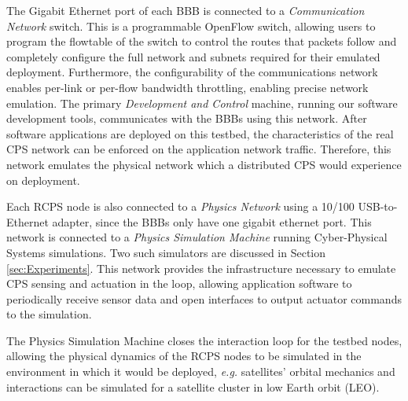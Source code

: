 The Gigabit Ethernet port of each BBB is connected to a \emph{Communication Network} switch. This is a programmable OpenFlow \cite{openflow} switch, allowing users to program the flowtable of the switch to control the routes that packets follow and completely configure the full network and subnets required for their emulated deployment.  Furthermore, the configurability of the communications network enables per-link or per-flow bandwidth throttling, enabling precise network emulation.  The primary \emph{Development and Control} machine, running our software development tools, communicates with the BBBs using this network. After software applications are deployed on this testbed, the characteristics of the real CPS network can be enforced on the application network traffic. Therefore, this network emulates the physical network which a distributed CPS would experience on deployment.

Each RCPS node is also connected to a \emph{Physics Network} using a 10/100 USB-to-Ethernet adapter, since the BBBs only have one gigabit ethernet port. This network is connected to a \emph{Physics Simulation Machine} running Cyber-Physical Systems simulations. Two such simulators are discussed in Section \ref{sec:Experiments}. This network provides the infrastructure necessary to emulate CPS sensing and actuation in the loop, allowing application software to periodically receive sensor data and open interfaces to output actuator commands to the simulation.

The Physics Simulation Machine closes the interaction loop for the testbed nodes, allowing the physical dynamics of the RCPS nodes to be simulated in the environment in which it would be deployed, \emph{e.g.} satellites' orbital mechanics and interactions can be simulated for a satellite cluster in low Earth orbit (LEO). 



